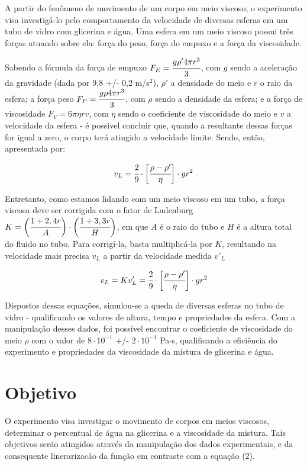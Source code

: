 \documentclass[english,brazil]{article}
\begin{document}
	A partir do fenômeno de movimento de um corpo em meio viscoso, o experimento visa investigá-lo pelo comportamento da velocidade de diversas esferas em um tubo de vidro com glicerina e água. Uma esfera em um meio viscoso possui três forças atuando sobre ela: força do peso, força do empuxo e a força da viscosidade. 

Sabendo a fórmula da força de empuxo $F_E = \cfrac{g \rho ' 4 \pi r^3}{3}$, com $g$ sendo a aceleração da gravidade (dada por 9,8 +/- 0,2 m/s$^2$), $\rho '$ a densidade do meio e $r$ o raio da esfera; a força peso $F_P =  \cfrac{g \rho 4 \pi r^3}{3}$, com $\rho$ sendo a densidade da esfera; e a força de viscosidade $F_V = 6\pi \eta r v$, com $\eta$ sendo o coeficiente de viscosidade do meio e $v$ a velocidade da esfera - é possivel concluir que, quando a resultante dessas forças for igual a zero, o corpo terá atingido a velocidade limite. Sendo, então, apresentada por:

\begin{equation}
	v_L = \cfrac{2}{9} \cdot \bigg[\cfrac{\rho - \rho '}{\eta}\bigg] \cdot g r^2
\end{equation}

Entretanto, como estamos lidando com um meio viscoso em um tubo, a força viscosa deve ser corrigida com o fator de Ladenburg $K = \bigg(\cfrac{1 + 2,4r}{A}\bigg) \cdot \bigg(\cfrac{1 + 3,3r}{H}\bigg)$, em que $A$ é o raio do tubo e $H$ é a altura total do fluido no tubo. Para corrigí-la, basta multiplicá-la por $K$, resultando na velocidade mais precisa $v_L$ a partir da velocidade medida $v'_L$

\begin{equation}
	v_L = K v_L ' = \cfrac{2}{9} \cdot \bigg[\cfrac{\rho - \rho '}{\eta}\bigg] \cdot g r^2
\end{equation}

Dispostos dessas equações, simulou-se a queda de diversas esferas no tubo de vidro - qualificando os valores de altura, tempo e propriedades da esfera. Com a manipulação desses dados, foi possível encontrar o coeficiente de viscosidade do meio $\rho$ com o valor de $8 \cdot 10^{-1}$ +/- $2 \cdot 10^{-1}$ Pa$\cdot$s, qualificando a eficiência do experimento e propriedades da viscosidade da mistura de glicerina e água.

\section{Objetivo}

	O experimento visa investigar o movimento de corpos em meios viscosos, determinar o percentual de água na glicerina e a viscosidade da mistura. Tais objetivos serão atingidos através da manipulação dos dados experimentais, e da consequente linerarizacão da função em contraste com a equação (2).
\end{document}
